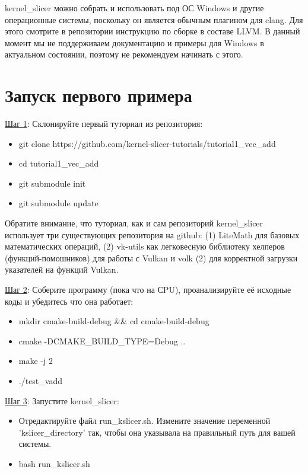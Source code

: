 \documentclass[11pt,fleqn,english,russian]{report} %
\begin{document}
\begin{remark}
	kernel\_slicer можно собрать и использовать под ОС Windows и другие операционные системы, поскольку он является обычным плагином для clang. Для этого смотрите в репозитории инструкцию по сборке в составе LLVM. В данный момент мы не поддерживаем документацию и примеры для Windows в актуальном состоянии, поэтому не рекомендуем начинать с этого. 
\end{remark}

\pagebreak
\section{Запуск первого примера}

\underline{Шаг 1}: Склонируйте первый туториал из репозитория:

\begin{itemize}
	\item git clone https://github.com/kernel-slicer-tutorials/tutorial1\_vec\_add
	\item cd tutorial1\_vec\_add
	\item git submodule init
	\item git submodule update
\end{itemize}

\vspace*{5px}
Обратите внимание, что туториал, как и сам репозиторий kernel\_slicer использует три существующих репозитория на github: (1) LiteMath для базовых математических операций, (2) vk-utils как легковесную библиотеку хелперов (функций-помошников) для работы с Vulkan и volk (2) для корректной загрузки указателей на функций Vulkan.

\vspace*{5px}
\noindent\underline{Шаг 2}: Соберите программу (пока что на СPU), проанализируйте её исходные коды и убедитесь что она работает: 
\begin{itemize}
	\item mkdir cmake-build-debug \&\& cd cmake-build-debug
	\item cmake -DCMAKE\_BUILD\_TYPE=Debug ..
	\item make -j 2
	\item ./test\_vadd 
\end{itemize}

\vspace*{5px}
\noindent\underline{Шаг 3}: Запустите kernel\_slicer:
\begin{itemize}
	\item Отредактируйте файл run\_kslicer.sh. Измените значение переменной 'kslicer\_directory' так, чтобы она указывала на правильный путь для вашей системы.
	\item bash run\_kslicer.sh 
\end{itemize}
\end{document}
